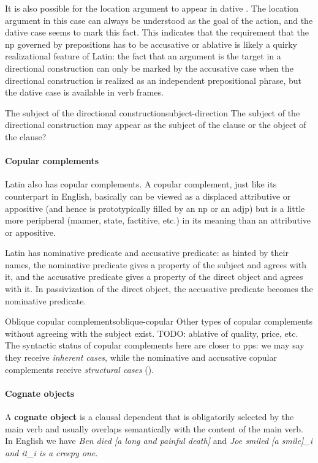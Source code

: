 \documentclass[a4paper, oneside, 12pt]{report}
\newcommand*{\citesec}[1]{\S~{#1}}
\newcommand*{\concept}[1]{\textbf{#1}}
\newcommand{\form}[1]{\emph{#1}}
\begin{document}
It is also possible for the location argument to appear in dative
\citep[\citesec{4.25}]{Pinkster1}.
The location argument in this case can always be understood as the goal of the action,
and the dative case seems to mark this fact.
This indicates that the requirement that 
the \ac{np} governed by prepositions has to be accusative or ablative
is likely a quirky realizational feature of Latin:
the fact that an argument is the target in a directional construction
can only be marked by the accusative case
when the directional construction is realized as an independent prepositional phrase,
but the dative case is available in verb frames.

\begin{todobox}{The subject of the directional construction}{subject-direction}
    The subject of the directional construction may appear as the subject of the clause 
    or the object of the clause?
\end{todobox}

\paragraph*{Copular complements}
Latin also has copular complements.
A copular complement, just like its counterpart in English,
basically can be viewed as a displaced attributive or appositive 
(and hence is prototypically filled by an \ac{np} or an \acs{adjp})
but is a little more peripheral (manner, state, factitive, etc.) 
in its meaning than an attributive or appositive.

Latin has nominative predicate and accusative predicate:
as hinted by their names, 
the nominative predicate gives a property of the subject and agrees with it,
and the accusative predicate gives a property of the direct object and agrees with it.
In passivization of the direct object,
the accusative predicate becomes the nominative predicate.

\begin{infobox}{Oblique copular complements}{oblique-copular}
    Other types of copular complements without agreeing with the subject exist.
    TODO: ablative of quality, price, etc. 
    The syntactic status of copular complements here are closer to \acs{pp}s:
    we may say they receive \emph{inherent cases},
    while the nominative and accusative copular complements 
    receive \emph{structural cases} 
    ().
\end{infobox}

\paragraph*{Cognate objects}
A \concept{cognate object} is a clausal dependent that is obligatorily selected by the main verb
and usually overlaps semantically with the content of the main verb.
In English we have \form{Ben died [a long and painful death]}
and \form{Joe smiled [a smile]_i and it_i is a creepy one}.
\end{document}
